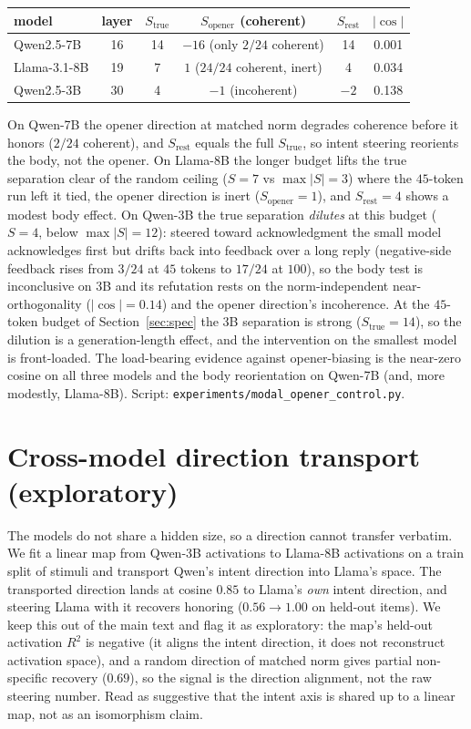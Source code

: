 \documentclass[11pt]{article}
\begin{document}
\begin{center}\small
\begin{tabular}{lccccc}
\toprule
model & layer & $S_{\mathrm{true}}$ & $S_{\mathrm{opener}}$ (coherent) & $S_{\mathrm{rest}}$ & $|\cos|$ \\
\midrule
Qwen2.5-7B   & 16 & 14 & $-16$ (only $2/24$ coherent) & 14 & 0.001 \\
Llama-3.1-8B & 19 &  7 & $1$ ($24/24$ coherent, inert) &  4 & 0.034 \\
Qwen2.5-3B   & 30 &  4 & $-1$ (incoherent)            & $-2$ & 0.138 \\
\bottomrule
\end{tabular}
\end{center}

On Qwen-7B the opener direction at matched norm degrades coherence before it honors ($2/24$ coherent), and
$S_{\mathrm{rest}}$ equals the full $S_{\mathrm{true}}$, so intent steering reorients the body, not the opener.
On Llama-8B the longer budget lifts the true separation clear of the random ceiling ($S{=}7$ vs $\max|S|{=}3$)
where the $45$-token run left it tied, the opener direction is inert ($S_{\mathrm{opener}}{=}1$), and
$S_{\mathrm{rest}}{=}4$ shows a modest body effect. On Qwen-3B the true separation \emph{dilutes} at this budget
($S{=}4$, below $\max|S|{=}12$): steered toward acknowledgment the small model acknowledges first but drifts
back into feedback over a long reply (negative-side feedback rises from $3/24$ at $45$ tokens to $17/24$ at
$100$), so the body test is inconclusive on 3B and its refutation rests on the norm-independent
near-orthogonality ($|\cos|{=}0.14$) and the opener direction's incoherence. At the $45$-token budget of
Section~\ref{sec:spec} the 3B separation is strong ($S_{\mathrm{true}}{=}14$), so the dilution is a
generation-length effect, and the intervention on the smallest model is front-loaded. The load-bearing evidence
against opener-biasing is the near-zero cosine on all three models and the body reorientation on Qwen-7B (and,
more modestly, Llama-8B). Script: \texttt{experiments/modal\_opener\_control.py}.

\section{Cross-model direction transport (exploratory)}
\label{app:transport}
The models do not share a hidden size, so a direction cannot transfer verbatim. We fit a linear map from
Qwen-3B activations to Llama-8B activations on a train split of stimuli and transport Qwen's intent direction
into Llama's space. The transported direction lands at cosine $0.85$ to Llama's \emph{own} intent direction,
and steering Llama with it recovers honoring ($0.56 \to 1.00$ on held-out items). We keep this out of the main
text and flag it as exploratory: the map's held-out activation $R^2$ is negative (it aligns the intent
direction, it does not reconstruct activation space), and a random direction of matched norm gives partial
non-specific recovery ($0.69$), so the signal is the direction alignment, not the raw steering number. Read as
suggestive that the intent axis is shared up to a linear map, not as an isomorphism claim.
\end{document}

